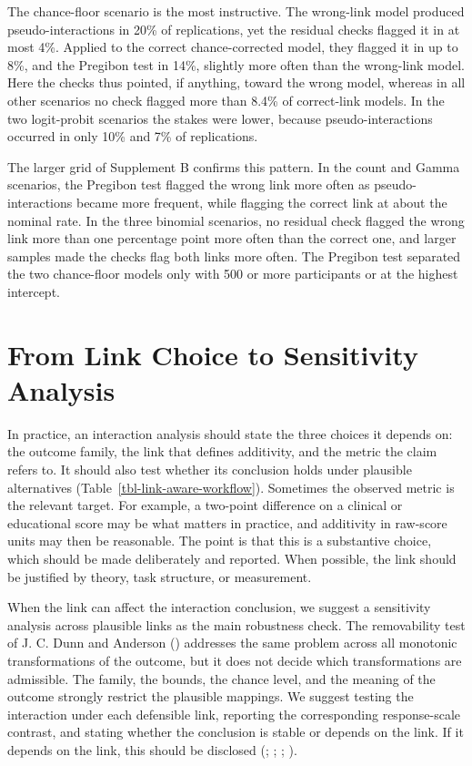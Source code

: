 \documentclass[
  man,
  floatsintext,
  longtable,
  nolmodern,
  notxfonts,
  notimes,
  colorlinks=true,linkcolor=blue,citecolor=blue,urlcolor=blue]{apa7}
\begin{document}
The chance-floor scenario is the most instructive. The wrong-link model
produced pseudo-interactions in 20\% of replications, yet the residual
checks flagged it in at most 4\%. Applied to the correct
chance-corrected model, they flagged it in up to 8\%, and the Pregibon
test in 14\%, slightly more often than the wrong-link model. Here the
checks thus pointed, if anything, toward the wrong model, whereas in all
other scenarios no check flagged more than 8.4\% of correct-link models.
In the two logit-probit scenarios the stakes were lower, because
pseudo-interactions occurred in only 10\% and 7\% of replications.

The larger grid of Supplement B confirms this pattern. In the count and
Gamma scenarios, the Pregibon test flagged the wrong link more often as
pseudo-interactions became more frequent, while flagging the correct
link at about the nominal rate. In the three binomial scenarios, no
residual check flagged the wrong link more than one percentage point
more often than the correct one, and larger samples made the checks flag
both links more often. The Pregibon test separated the two chance-floor
models only with 500 or more participants or at the highest intercept.

\section{From Link Choice to Sensitivity
Analysis}\label{from-link-choice-to-sensitivity-analysis}

In practice, an interaction analysis should state the three choices it
depends on: the outcome family, the link that defines additivity, and
the metric the claim refers to. It should also test whether its
conclusion holds under plausible alternatives
(Table~\ref{tbl-link-aware-workflow}). Sometimes the observed metric is
the relevant target. For example, a two-point difference on a clinical
or educational score may be what matters in practice, and additivity in
raw-score units may then be reasonable. The point is that this is a
substantive choice, which should be made deliberately and reported. When
possible, the link should be justified by theory, task structure, or
measurement.

When the link can affect the interaction conclusion, we suggest a
sensitivity analysis across plausible links as the main robustness
check. The removability test of J. C. Dunn and Anderson
() addresses the same problem
across all monotonic transformations of the outcome, but it does not
decide which transformations are admissible. The family, the bounds, the
chance level, and the meaning of the outcome strongly restrict the
plausible mappings. We suggest testing the interaction under each
defensible link, reporting the corresponding response-scale contrast,
and stating whether the conclusion is stable or depends on the link. If
it depends on the link, this should be disclosed
(;
;
;
).
\end{document}

